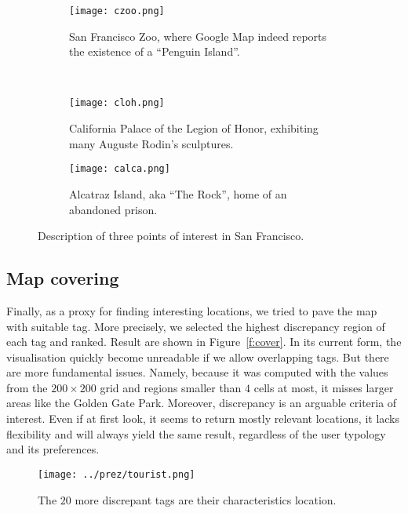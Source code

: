 \begin{figure}
        \centering
        \begin{subfigure}[b]{0.5\textwidth}
                \texttt{[image: czoo.png]}
                \caption{San Francisco Zoo, where Google Map indeed reports
the existence of a \enquote{Penguin Island}.}
        \end{subfigure}~
        \begin{subfigure}[b]{0.5\textwidth}
                \texttt{[image: cloh.png]}
                \caption{California Palace of the Legion of Honor, exhibiting
many Auguste Rodin's sculptures.}
        \end{subfigure}

        \begin{subfigure}[b]{0.5\textwidth}
                \texttt{[image: calca.png]}
                \caption{Alcatraz Island, aka \enquote{The Rock}, home of an
abandoned prison.}
        \end{subfigure}
		\caption{Description of three points of interest in San Francisco.\label{f:loc}}
\end{figure}

\subsection{Map covering}

Finally, as a proxy for finding interesting locations, we tried to pave the
map with suitable tag. More precisely, we selected the highest discrepancy
region of each tag and ranked. Result are shown in Figure~\vref{f:cover}. In
its current form, the visualisation quickly become unreadable if we allow
overlapping tags. But there are more fundamental issues. Namely, because it
was computed with the values from the $200\times 200$ grid and regions smaller
than $4$ cells at most, it misses larger areas like the Golden Gate Park.
Moreover, discrepancy is an arguable criteria of interest. Even if at first
look, it seems to return mostly relevant locations, it lacks flexibility and
will always yield the same result, regardless of the user typology and its
preferences.

\begin{figure}[hbtp]
\centering
\texttt{[image: ../prez/tourist.png]}
\caption{The $20$ more discrepant tags are their characteristics location.\label{f:cover}}
\end{figure}
